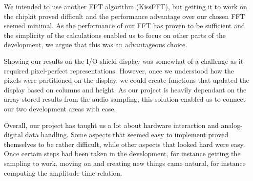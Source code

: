 \documentclass[a4paper,11pt]{article}
\begin{document}
We intended to use another FFT algorithm (KissFFT), but getting it to work on the chipkit proved difficult and the performance advantage over our chosen FFT seemed minimal. As the performance of our FFT has proven to be sufficient and the simplicity of the calculations enabled us to focus on other parts of the development, we argue that this was an advantageous choice.

Showing our results on the I/O-shield display was somewhat of a challenge as it required pixel-perfect representations. However, once we understood how the pixels were partitioned on the display, we could create functions that updated the display based on columns and height. As our project is heavily dependant on the array-stored results from the audio sampling, this solution enabled us to connect our two development areas with ease.

Overall, our project has taught us a lot about hardware interaction and analog-digital data handling. Some aspects that seemed easy to implement proved themselves to be rather difficult, while other aspects that looked hard were easy. Once certain steps had been taken in the development, for instance getting the sampling to work, moving on and creating new things came natural, for instance computing the amplitude-time relation.
\end{document}

